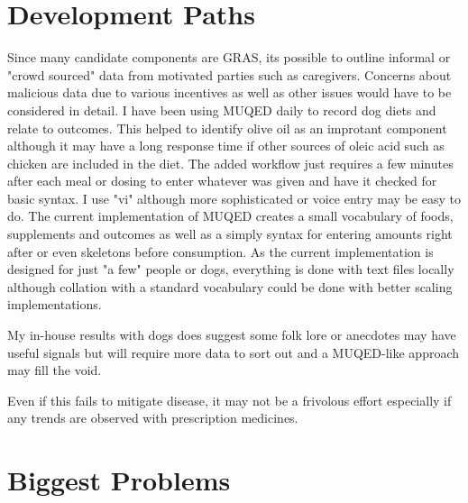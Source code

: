 

\section{Development Paths}
Since many candidate components are GRAS, its possible to outline
informal or "crowd sourced" data from motivated parties such
as caregivers. 
Concerns about malicious data due to various incentives as well
as other issues would have to be considered in detail.
I have been using MUQED daily to record
dog diets and relate to outcomes. This helped to identify
olive oil as an improtant component although it may have
a long response time if other sources of oleic
acid such as chicken are included in the diet. 
The added workflow just requires a few minutes after each
meal or dosing to enter whatever was given and have it checked
for basic syntax. I use "vi" although more sophisticated or
voice entry may be easy to do. 
The current
implementation of MUQED creates a small vocabulary of
foods, supplements and outcomes as well as a simply syntax
for entering amounts right after or even skeletons before
consumption. As the current implementation is designed
for just "a few" people or dogs, everything is done with
text files locally although collation with a standard vocabulary
could be done with better scaling implementations.   

My in-house results with dogs does suggest some folk lore
or anecdotes may have useful signals but will require more
data to sort out and a MUQED-like approach may fill the void.

Even if this fails to mitigate disease, it may not be a 
frivolous effort especially
if any trends are observed with prescription medicines.

\section{Biggest Problems }


